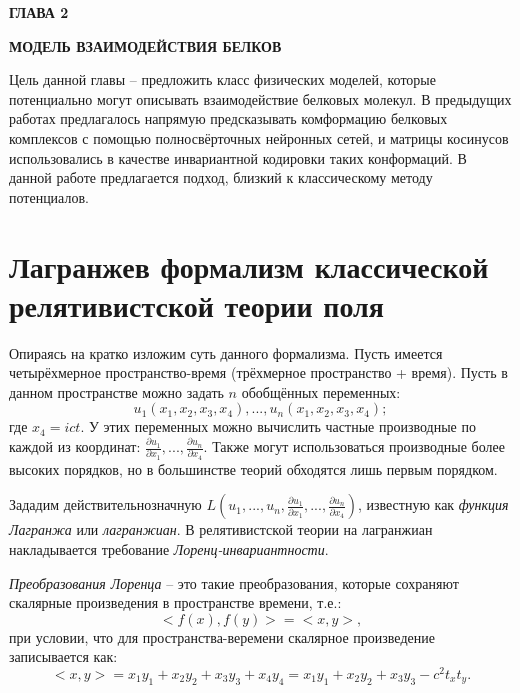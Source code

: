 \newpage
\begin{center}
	\textbf{\large ГЛАВА 2}

	\textbf{\large МОДЕЛЬ ВЗАИМОДЕЙСТВИЯ БЕЛКОВ}
\end{center}

Цель данной главы -- предложить класс физических моделей, которые потенциально могут описывать взаимодействие белковых молекул.
В предыдущих работах \cite{prip2023} предлагалось напрямую предсказывать комформацию белковых комплексов с помощью полносвёрточных нейронных сетей,
и матрицы косинусов использовались в качестве инвариантной кодировки таких конформаций. В данной работе предлагается подход, близкий к классическому методу потенциалов.

\section{Лагранжев формализм классической релятивистской теории поля}
Опираясь на \cite{field_theory} кратко изложим суть данного формализма. Пусть имеется четырёхмерное пространство-время (трёхмерное пространство + время).
Пусть в данном пространстве можно задать $n$ обобщённых переменных:
\begin{equation}
	u_1(x_1, x_2, x_3, x_4), ..., u_n(x_1, x_2, x_3, x_4);
	\label{generalized_variables}
\end{equation}
где $x_4 = ict$. У этих переменных можно вычислить
частные производные по каждой из координат: $\frac{\partial{u_1}}{\partial{x_1}}, ..., \frac{\partial{u_n}}{\partial{x_4}}$. Также могут использоваться производные
более высоких порядков, но в большинстве теорий обходятся лишь первым порядком.

Зададим действительнозначную $L(u_1, ..., u_n, \frac{\partial{u_1}}{\partial{x_1}}, ..., \frac{\partial{u_n}}{\partial{x_4}})$, известную как \textit{функция Лагранжа} или \textit{лагранжиан}.
В релятивистской теории на лагранжиан накладывается требование \textit{Лоренц-инвариантности}.

\textit{Преобразования Лоренца} -- это такие преобразования, которые сохраняют скалярные произведения в пространстве времени, т.е.:
\begin{equation}
	<f(x), f(y)> = <x, y>,
	\label{Lorenz_group}
\end{equation}
при условии, что для пространства-веремени скалярное произведение записывается как:
\begin{equation}
	<x, y> = x_1y_1 + x_2y_2 + x_3y_3 + x_4y_4 = x_1y_1 + x_2y_2 + x_3y_3 - c^2t_xt_y.
	\label{Minkowski_product}
\end{equation}

